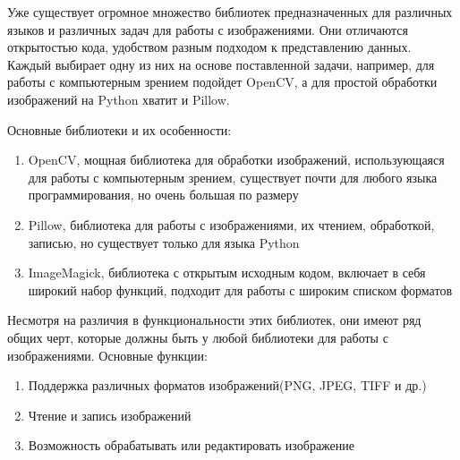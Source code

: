 Уже существует огромное множество библиотек предназначенных для различных языков и различных задач для работы с изображениями. Они отличаются открытостью кода, удобством разным подходом к представлению данных. Каждый выбирает одну из них на основе поставленной задачи, например, для работы с компьютерным зрением подойдет OpenCV, а для простой обработки изображений на Python хватит и Pillow.

Основные библиотеки и их особенности:
\begin{enumerate}
\item OpenCV, мощная библиотека для обработки изображений, использующаяся для работы с компьютерным зрением, существует почти для любого языка программирования, но очень большая по размеру
\item Pillow, библиотека для работы с изображениями, их чтением, обработкой, записью, но существует только для языка Python
\item ImageMagick, библиотека с открытым исходным кодом, включает в себя широкий набор функций, подходит для работы с широким списком форматов
\end{enumerate}

Несмотря на различия в функциональности этих библиотек, они имеют ряд общих черт, которые должны быть у любой библиотеки для работы с изображениями.
Основные функции:
\begin{enumerate}
\item Поддержка различных форматов изображений(PNG, JPEG, TIFF и др.)
\item Чтение и запись изображений
\item Возможность обрабатывать или редактировать изображение
\end{enumerate}

